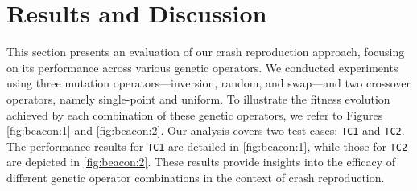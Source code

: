 \section{Results and Discussion}
\label{sec:results}
    This section presents an evaluation of our crash reproduction approach, focusing on its performance across various 
    genetic operators. We conducted experiments using three mutation operators—inversion, random, and swap—and two 
    crossover operators, namely single-point and uniform. To illustrate the fitness evolution achieved by each 
    combination of these genetic operators, we refer to Figures \ref{fig:beacon:1} and \ref{fig:beacon:2}. Our 
    analysis covers two test cases: \texttt{TC1} and \texttt{TC2}. The performance results for \texttt{TC1} are detailed 
    in \vref{fig:beacon:1}, while those for \texttt{TC2} are depicted in \vref{fig:beacon:2}. 
    These results provide insights into the efficacy of different genetic 
    operator combinations in the context of crash reproduction.

